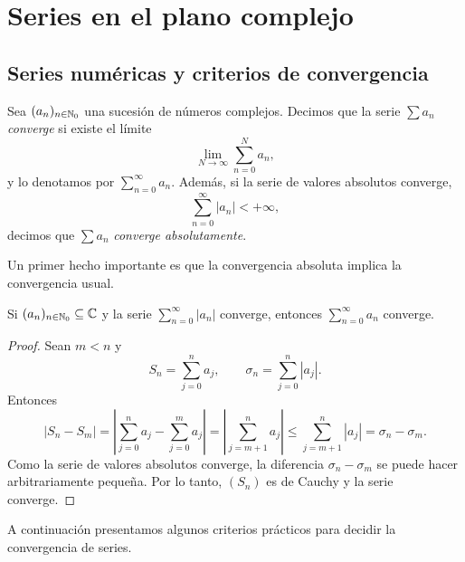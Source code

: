 \chapter{Series en el plano complejo}

\section{Series numéricas y criterios de convergencia}

\begin{definition}
    Sea $(a_n)_{n \in \mathbb{N}_0}$ una sucesión de números complejos. 
    Decimos que la serie $\sum a_n$ \emph{converge} si existe el límite
    \begin{equation*}
        \lim_{N \to \infty} \sum_{n=0}^N a_n,
    \end{equation*}
    y lo denotamos por $\sum_{n=0}^\infty a_n$. Además, si la serie de valores absolutos converge,
    \begin{equation*}
        \sum_{n=0}^\infty |a_n| < +\infty,
    \end{equation*}
    decimos que $\sum a_n$ \emph{converge absolutamente}.
\end{definition}

Un primer hecho importante es que la convergencia absoluta implica la convergencia usual.  

\begin{proposition}
    Si $(a_n)_{n \in \mathbb{N}_0} \subseteq \mathbb{C}$ y la serie $\sum_{n=0}^{\infty} |a_n|$ converge, 
    entonces $\sum_{n=0}^{\infty} a_n$ converge.
\end{proposition}

\begin{proof}
    Sean $m<n$ y
    \begin{equation*}
        S_n = \sum_{j=0}^n a_j, \qquad 
        \sigma_n = \sum_{j=0}^n |a_j|.
    \end{equation*}
    Entonces
    \begin{equation*}
        |S_n - S_m|
        = \left|\sum_{j=0}^n a_j - \sum_{j=0}^m a_j\right|
        = \left|\sum_{j=m+1}^n a_j\right|
        \leq \sum_{j=m+1}^n |a_j|
        = \sigma_n - \sigma_m.
    \end{equation*}
    Como la serie de valores absolutos converge, 
    la diferencia $\sigma_n - \sigma_m$ se puede hacer arbitrariamente pequeña. 
    Por lo tanto, $(S_n)$ es de Cauchy y la serie converge.
\end{proof}

A continuación presentamos algunos criterios prácticos para decidir la convergencia de series.  

